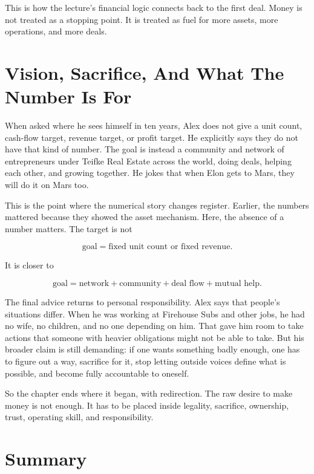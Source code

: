 This is how the lecture's financial logic connects back to the first deal. Money is not treated as a stopping point. It is treated as fuel for more assets, more operations, and more deals.

\section{Vision, Sacrifice, And What The Number Is For}

When asked where he sees himself in ten years, Alex does not give a unit count, cash-flow target, revenue target, or profit target. He explicitly says they do not have that kind of number. The goal is instead a community and network of entrepreneurs under Teifke Real Estate across the world, doing deals, helping each other, and growing together. He jokes that when Elon gets to Mars, they will do it on Mars too.

This is the point where the numerical story changes register. Earlier, the numbers mattered because they showed the asset mechanism. Here, the absence of a number matters. The target is not

\begin{equation}
\text{goal} = \text{fixed unit count or fixed revenue}.
\end{equation}

It is closer to

\begin{equation}
\text{goal}
=
\text{network}
+
\text{community}
+
\text{deal flow}
+
\text{mutual help}.
\end{equation}

The final advice returns to personal responsibility. Alex says that people's situations differ. When he was working at Firehouse Subs and other jobs, he had no wife, no children, and no one depending on him. That gave him room to take actions that someone with heavier obligations might not be able to take. But his broader claim is still demanding: if one wants something badly enough, one has to figure out a way, sacrifice for it, stop letting outside voices define what is possible, and become fully accountable to oneself.

So the chapter ends where it began, with redirection. The raw desire to make money is not enough. It has to be placed inside legality, sacrifice, ownership, trust, operating skill, and responsibility.

\section{Summary}

